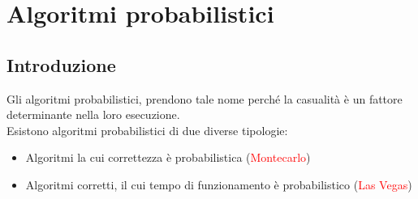 \documentclass[../cheatSheetAlgoritmi.tex]{subfiles}
\begin{document}
\section{Algoritmi probabilistici}
\subsection{Introduzione}
Gli algoritmi probabilistici, prendono tale nome perché la casualità è un fattore determinante nella loro esecuzione. \\
Esistono algoritmi probabilistici di due diverse tipologie:
\begin{itemize}
	\item Algoritmi la cui correttezza è probabilistica (\textcolor{red}{Montecarlo})
	\item Algoritmi corretti, il cui tempo di funzionamento è probabilistico (\textcolor{red}{Las Vegas})
\end{itemize}
\end{document}
